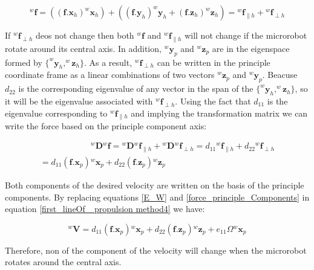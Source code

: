 \documentclass[12pt,a4paper,titlepage]{report}
\begin{document}
\begin{equation}
{^{w}\bm{f}} = \left ( (\bm{f} . \bm{x}_h) ^{w}\bm{x}_h \right) +  \left ( (\bm{f} . \bm{y}_h) ^{w}\bm{y}_h
 +  (\bm{f} . \bm{z}_h) ^{w}\bm{z}_h \right) = {^{w}\bm{f}}_{\parallel h} + {^{w}\bm{f}}_{\perp h}
\label{f_Component_globalAxis}
\end{equation}

If ${^{w}\bm{f}}_{\perp h}$ deos not change then both ${^{w}\bm{f}}$ and ${^{w}\bm{f}}_{\parallel h}$ will 
not change if the microrobot rotate around its central axis. In addition, $^{w}\bm{y}_p$ and $^{w}\bm{z}_p$ are 
in the eigenspace formed by $\{ ^{w}\bm{y}_h ,   ^{w}\bm{z}_h  \}$. As a result, ${^{w}\bm{f}}_{\perp h}$ can be written in the 
principle coordinate frame as a linear combinations of two vectors ${^{w}\bm{z}}_{p}$ and 
${^{w}\bm{y}}_{p}$. Beacuse $d_{22}$ is the corresponding eigenvalue of any vector in the span of the
 $\{ ^{w}\bm{y}_h , ^{w}\bm{z}_h  \}$, so it will be the eigenvalue associated with ${^{w}\bm{f}}_{\perp h}$.
Using the fact that $d_{11}$ is the eigenvalue corresponding to $ {^{w}\bm{f}}_{\parallel h} $ and implying 
the transformation matrix we can write the force based on the principle component axis:
   


\begin{multline}
\qquad \qquad     \qquad   {^{w}\bm{D}} {^{w}\bm{f}} = {^{w}\bm{D}} {^{w}\bm{f}}_{\parallel h} + {^{w}\bm{D}} {^{w}\bm{f}}_{\perp h}
= d_{11} {^{w}\bm{f}}_{\parallel h} + d_{22}  {^{w}\bm{f}}_{\perp h}\\ 
= d_{11} \left ({\bm{f} . {\bm{x}}_p   }  \right) {^{w}\bm{x}}_p + 
 d_{22} \left ({\bm{f} . {\bm{z}}_p   }  \right) {^{w}\bm{z}}_p  \qquad \qquad
\label{force_principle_Components}
\end{multline} 

Both components  of the desired velocity are written on the basis of the principle components.
By replacing equations \ref{E_W} and \ref{force_principle_Components} in equation \ref{first_lineOf_ propulsion method4} we have:



\begin{equation}
^{w}\bm{V}  =   d_{11} \left ({\bm{f} . {\bm{x}}_p   }  \right) {^{w}\bm{x}}_p + 
 d_{22} \left ({\bm{f} . {\bm{z}}_p   }  \right) {^{w}\bm{z}}_p + e_{11} \Omega {^{w}{\bm{x}_p}}
\label{velocity_based_principle}  
\end{equation}

Therefore, non of the component of the velocity will change when the microrobot rotates around the central
axis. 
\end{document}
